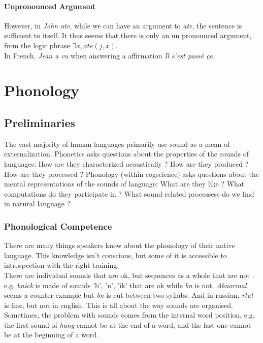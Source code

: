 \documentclass{cours}
\begin{document}
\paragraph{Unpronounced Argument}
However, in \textsl{John ate}, while we can have an argument to \textsl{ate}, the sentence is sufficient to itself.
It thus seems that there is only an un pronounced argument, from the logic phrase $\exists x, ate(j, x)$. \\
In French, \textsl{Jean a vu} when answering a affirmation \textsl{Il s'est passé ça}. \\


\section[Class 7\! : 23/11]{Phonology}
\subsection{Preliminaries}
The vast majority of human languages primarily use sound as a mean of externalization. Phonetics asks questions about the properties of the sounds of languages\!: How are they characterized acoustically ? How are they produced ? How are they processed ? Phonology (within cogscience) asks questions about the mental representations of the sounds of language\!: What are they like ? What computations do they participate in ? What sound-related processess do we find in natural language ?

\subsubsection{Phonological Competence}
There are many things speakers know about the phonology of their native language. This knowledge isn't conscious, but some of it is accessible to introspection with the right training.\\
There are individual sounds that are ok, but sequences as a whole that are not\! : e.g. \textsl{bnick} is made of sounds 'b', 'n', 'ik' that are ok while \textsl{bn} is not. \textsl{Abnormal} seems a counter-example but \textsl{bn} is cut between two syllabs. And in russian, \textsl{rtut} is fine, but not in english. This is all about the way sounds are organised. \\
Sometimes, the problem with sounds comes from the internal word position, e.g. the first sound of \textsl{hang} cannot be at the end of a word, and the last one cannot be at the beginning of a word.
\end{document}
